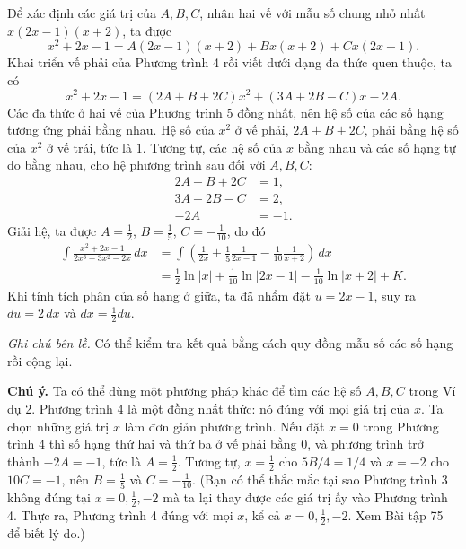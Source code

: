 \documentclass[12pt,a4paper]{article}
\begin{document}
Để xác định các giá trị của $A,B,C$, nhân hai vế với mẫu số chung nhỏ nhất $x(2x-1)(x+2)$, ta được
\begin{equation}x^2+2x-1=A(2x-1)(x+2)+Bx(x+2)+Cx(2x-1).\tag{4}\end{equation}
Khai triển vế phải của Phương trình 4 rồi viết dưới dạng đa thức quen thuộc, ta có
\begin{equation}x^2+2x-1=(2A+B+2C)x^2+(3A+2B-C)x-2A.\tag{5}\end{equation}
Các đa thức ở hai vế của Phương trình 5 đồng nhất, nên hệ số của các số hạng tương ứng phải bằng nhau. Hệ số của $x^2$ ở vế phải, $2A+B+2C$, phải bằng hệ số của $x^2$ ở vế trái, tức là $1$. Tương tự, các hệ số của $x$ bằng nhau và các số hạng tự do bằng nhau, cho hệ phương trình sau đối với $A,B,C$:
\begin{align*}
2A+B+2C&=1,\\
3A+2B-C&=2,\\
-2A&=-1.
\end{align*}
Giải hệ, ta được $A=\frac12$, $B=\frac15$, $C=-\frac1{10}$, do đó
\begin{align*}
\int\frac{x^2+2x-1}{2x^3+3x^2-2x}\,dx
&=\int\left(\frac1{2x}+\frac15\frac1{2x-1}-\frac1{10}\frac1{x+2}\right)\,dx\\
&=\frac12\ln|x|+\frac1{10}\ln|2x-1|-\frac1{10}\ln|x+2|+K.
\end{align*}
Khi tính tích phân của số hạng ở giữa, ta đã nhẩm đặt $u=2x-1$, suy ra $du=2\,dx$ và $dx=\frac12du$.

\textit{Ghi chú bên lề.} Có thể kiểm tra kết quả bằng cách quy đồng mẫu số các số hạng rồi cộng lại.

\textbf{Chú ý.} Ta có thể dùng một phương pháp khác để tìm các hệ số $A,B,C$ trong Ví dụ 2. Phương trình 4 là một đồng nhất thức: nó đúng với mọi giá trị của $x$. Ta chọn những giá trị $x$ làm đơn giản phương trình. Nếu đặt $x=0$ trong Phương trình 4 thì số hạng thứ hai và thứ ba ở vế phải bằng $0$, và phương trình trở thành $-2A=-1$, tức là $A=\frac12$. Tương tự, $x=\frac12$ cho $5B/4=1/4$ và $x=-2$ cho $10C=-1$, nên $B=\frac15$ và $C=-\frac1{10}$. (Bạn có thể thắc mắc tại sao Phương trình 3 không đúng tại $x=0,\frac12,-2$ mà ta lại thay được các giá trị ấy vào Phương trình 4. Thực ra, Phương trình 4 đúng với mọi $x$, kể cả $x=0,\frac12,-2$. Xem Bài tập 75 để biết lý do.)
\end{document}

